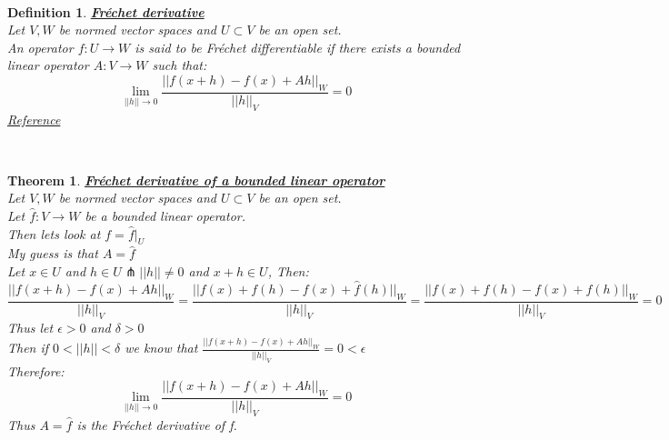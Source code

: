 \documentclass[12pt]{extarticle}
\theoremstyle{plain}
\newtheorem{thm}{Theorem}[section]
\theoremstyle{plain}
\theoremstyle{plain}
\theoremstyle{Definition}
\newtheorem{def.}{Definition}[section]
\theoremstyle{Definition}
\theoremstyle{plain}
\theoremstyle{plain}
\newcommand{\cut}[0]{\noindent\framebox[\linewidth]{\rule{\linewidth}{2pt}}\\}
\begin{document}
\cut
\begin{def.} \underline{\textbf{Fréchet derivative}} \\ 
		Let $V,W$ be normed vector spaces and $U \subset V$ be an open set. \\ 
		An operator $f : U \to W$ is said to be Fréchet differentiable if there exists a bounded linear operator $A : V \to W$ such that: \\ 
		$$\lim_{||h||\to0} \frac{||f(x+h) - f(x) + Ah||_W}{||h||_V} = 0$$
		\href{https://en.wikipedia.org/wiki/Fr%C3%A9chet_derivative}{Reference}
\end{def.} 
\cut
\begin{thm} \underline{\textbf{Fréchet derivative of a bounded linear operator}} \\ 
	Let $V,W$ be normed vector spaces and $U \subset V$ be an open set. \\ 
	Let $\hat{f} : V \to W$ be a bounded linear operator. \\
	Then lets look at $f = \hat{f}|_{U}$ \\ 
	My guess is that $A = \hat{f}$ \\ 
	Let $x \in U$ and $h \in U \pitchfork ||h|| \not = 0$ and $x+h \in U$, Then: \\ 
	$$\frac{||f(x+h) - f(x) + Ah||_W}{||h||_V} = \frac{||f(x)+f(h) - f(x) + \hat{f}(h)||_W}{||h||_V} = \frac{||f(x)+f(h) - f(x) + f(h)||_W}{||h||_V}= 0$$
	Thus let $\epsilon > 0$ and $\delta > 0$ \\ 
	Then if $0 < ||h|| < \delta$ we know that  
	$\frac{||f(x+h) - f(x) + Ah||_W}{||h||_V} = 0 < \epsilon$ \\ 
	Therefore: 
	$$\lim_{||h||\to0} \frac{||f(x+h) - f(x) + Ah||_W}{||h||_V} = 0$$
	Thus $A = \hat{f}$ is the Fréchet derivative  of f. 
\end{thm}
\cut
\end{document}
